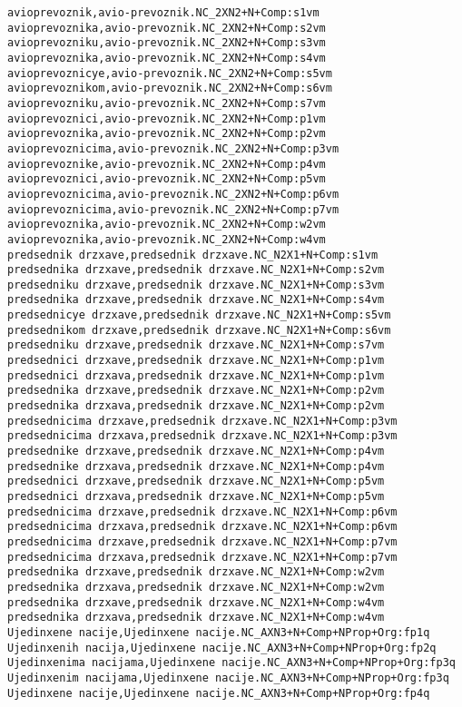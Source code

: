 \begin{verbatim}
avioprevoznik,avio-prevoznik.NC_2XN2+N+Comp:s1vm
avioprevoznika,avio-prevoznik.NC_2XN2+N+Comp:s2vm
avioprevozniku,avio-prevoznik.NC_2XN2+N+Comp:s3vm
avioprevoznika,avio-prevoznik.NC_2XN2+N+Comp:s4vm
avioprevoznicye,avio-prevoznik.NC_2XN2+N+Comp:s5vm
avioprevoznikom,avio-prevoznik.NC_2XN2+N+Comp:s6vm
avioprevozniku,avio-prevoznik.NC_2XN2+N+Comp:s7vm
avioprevoznici,avio-prevoznik.NC_2XN2+N+Comp:p1vm
avioprevoznika,avio-prevoznik.NC_2XN2+N+Comp:p2vm
avioprevoznicima,avio-prevoznik.NC_2XN2+N+Comp:p3vm
avioprevoznike,avio-prevoznik.NC_2XN2+N+Comp:p4vm
avioprevoznici,avio-prevoznik.NC_2XN2+N+Comp:p5vm
avioprevoznicima,avio-prevoznik.NC_2XN2+N+Comp:p6vm
avioprevoznicima,avio-prevoznik.NC_2XN2+N+Comp:p7vm
avioprevoznika,avio-prevoznik.NC_2XN2+N+Comp:w2vm
avioprevoznika,avio-prevoznik.NC_2XN2+N+Comp:w4vm
predsednik drzxave,predsednik drzxave.NC_N2X1+N+Comp:s1vm
predsednika drzxave,predsednik drzxave.NC_N2X1+N+Comp:s2vm
predsedniku drzxave,predsednik drzxave.NC_N2X1+N+Comp:s3vm
predsednika drzxave,predsednik drzxave.NC_N2X1+N+Comp:s4vm
predsednicye drzxave,predsednik drzxave.NC_N2X1+N+Comp:s5vm
predsednikom drzxave,predsednik drzxave.NC_N2X1+N+Comp:s6vm
predsedniku drzxave,predsednik drzxave.NC_N2X1+N+Comp:s7vm
predsednici drzxave,predsednik drzxave.NC_N2X1+N+Comp:p1vm
predsednici drzxava,predsednik drzxave.NC_N2X1+N+Comp:p1vm
predsednika drzxave,predsednik drzxave.NC_N2X1+N+Comp:p2vm
predsednika drzxava,predsednik drzxave.NC_N2X1+N+Comp:p2vm
predsednicima drzxave,predsednik drzxave.NC_N2X1+N+Comp:p3vm
predsednicima drzxava,predsednik drzxave.NC_N2X1+N+Comp:p3vm
predsednike drzxave,predsednik drzxave.NC_N2X1+N+Comp:p4vm
predsednike drzxava,predsednik drzxave.NC_N2X1+N+Comp:p4vm
predsednici drzxave,predsednik drzxave.NC_N2X1+N+Comp:p5vm
predsednici drzxava,predsednik drzxave.NC_N2X1+N+Comp:p5vm
predsednicima drzxave,predsednik drzxave.NC_N2X1+N+Comp:p6vm
predsednicima drzxava,predsednik drzxave.NC_N2X1+N+Comp:p6vm
predsednicima drzxave,predsednik drzxave.NC_N2X1+N+Comp:p7vm
predsednicima drzxava,predsednik drzxave.NC_N2X1+N+Comp:p7vm
predsednika drzxave,predsednik drzxave.NC_N2X1+N+Comp:w2vm
predsednika drzxava,predsednik drzxave.NC_N2X1+N+Comp:w2vm
predsednika drzxave,predsednik drzxave.NC_N2X1+N+Comp:w4vm
predsednika drzxava,predsednik drzxave.NC_N2X1+N+Comp:w4vm
Ujedinxene nacije,Ujedinxene nacije.NC_AXN3+N+Comp+NProp+Org:fp1q
Ujedinxenih nacija,Ujedinxene nacije.NC_AXN3+N+Comp+NProp+Org:fp2q
Ujedinxenima nacijama,Ujedinxene nacije.NC_AXN3+N+Comp+NProp+Org:fp3q
Ujedinxenim nacijama,Ujedinxene nacije.NC_AXN3+N+Comp+NProp+Org:fp3q
Ujedinxene nacije,Ujedinxene nacije.NC_AXN3+N+Comp+NProp+Org:fp4q

\end{verbatim}
